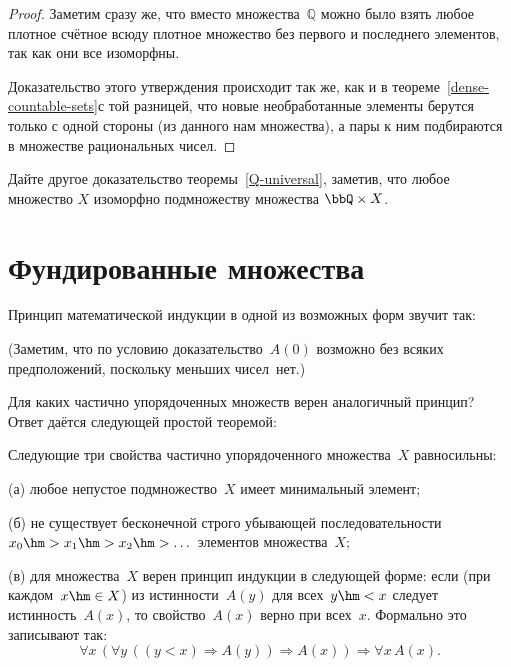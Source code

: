 \begin{proof}
Заметим сразу же, что вместо множества~$\mathbb{Q}$ можно было взять
любое плотное счётное всюду плотное множество без первого
и последнего элементов, так как они все изоморфны.

Доказательство этого утверждения происходит так же, как и в
теореме~\ref{dense-countable-sets}\т с той разницей, что
новые необработанные элементы берутся только с одной стороны
(из данного нам множества), а пары к ним подбираются в
множестве рациональных чисел.
\end{proof}

\begin{problem}
Дайте другое доказательство теоремы~\ref{Q-universal}, заметив,
что любое множество $X$ изоморфно подмножеству множества
$\bbQ\times X$.
\end{problem}

\section{Фундированные множества}
        \label{well-founded-sets}

Принцип математической индукции
в одной из возможных форм звучит так:

(Заметим, что по условию доказательство~$A(0)$ возможно без всяких
предположений, поскольку меньших чи\-сел~нет.)

Для каких частично упорядоченных множеств верен аналогичный
принцип? Ответ даётся следующей простой теоремой:

\begin{theorem}
        \label{well-founded-induction}%
Следующие три свойства частично упорядоченного множества~$X$
равносильны:

(\textsf{а}) любое непустое подмножество~$X$ имеет минимальный
элемент;

(\textsf{б}) не существует бесконечной строго убывающей
последовательности $x_0\hm>x_1\hm>x_2\hm>\dots$ элементов множества~$X$;

(\textsf{в}) для множества~$X$ верен принцип индукции в следующей
форме: если (при каждом~$x\hm\in X$)
из истинности~$A(y)$ для всех~$y\hm<x$ следует истинность~$A(x)$,
то свойство~$A(x)$ верно при всех~$x$.
Формально это записывают так:
        $$
\forall x\, (\forall y \, ((y<x)\Rightarrow A(y))\Rightarrow A(x))
\Rightarrow
\forall x\, A(x).
        $$
\end{theorem}

